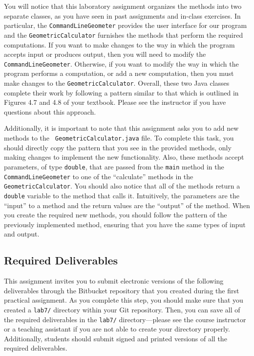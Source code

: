 You will notice that this laboratory assignment organizes the methods into two separate classes, as you have seen in
past assignments and in-class exercises. In particular, the {\tt CommandLineGeometer} provides the user interface for
our program and the {\tt GeometricCalculator} furnishes the methods that perform the required computations.  If you want
to make changes to the way in which the program accepts input or produces output, then you will need to modify the {\tt
CommandLineGeometer}. Otherwise, if you want to modify the way in which the program performs a computation, or add a
new computation, then you must make changes to the {\tt GeometricCalculator}. Overall, these two Java classes complete
their work by following a pattern similar to that which is outlined in Figures 4.7 and 4.8 of your textbook. Please see
the instructor if you have questions about this approach.

Additionally, it is important to note that this assignment asks you to add new methods to the {\tt
GeometricCalculator.java} file.  To complete this task, you should directly copy the pattern that you see in the
provided methods, only making changes to implement the new functionality.  Also, these methods accept parameters, of
type {\tt double}, that are passed from the {\tt main} method in the {\tt CommandLineGeometer} to one of the
``calculate'' methods in the {\tt GeometricCalculator}. You should also notice that all of the methods return a {\tt
double} variable to the method that calls it.  Intuitively, the parameters are the ``input'' to a method and the return
values are the ``output'' of the method.  When you create the required new methods, you should follow the pattern of the
previously implemented method, ensuring that you have the same types of input and output.

\vspace*{-.1in}
\subsection*{Required Deliverables}

This assignment invites you to submit electronic versions of the following deliverables through the Bitbucket repository
that you created during the first practical assignment.  As you complete this step, you should make sure that you
created a {\tt lab7/} directory within your Git repository.  Then, you can save all of the required deliverables in the
{\tt lab7/} directory---please see the course instructor or a teaching assistant if you are not able to create your
directory properly.  Additionally, students should submit signed and printed versions of all the required deliverables.

